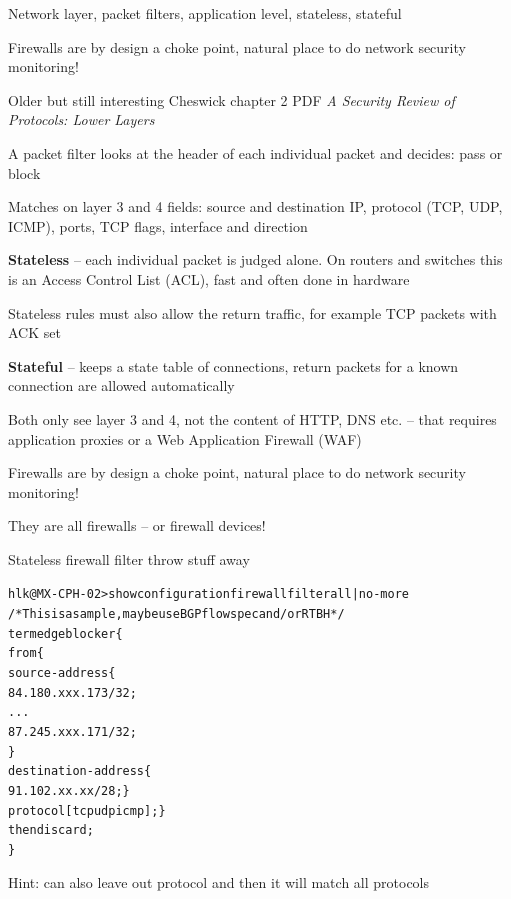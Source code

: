 \documentclass[Screen16to9,17pt]{foils}
\begin{document}
\begin{list2}
\item Network layer, packet filters, application level, stateless, stateful
\item Firewalls are by design a choke point, natural place to do network security monitoring!
\item Older but still interesting Cheswick chapter 2 PDF
\emph{A Security Review of Protocols:
Lower Layers}\\
\end{list2}



A packet filter looks at the header of each individual packet and decides: pass or block
\begin{list2}
\item Matches on layer 3 and 4 fields: source and destination IP, protocol (TCP, UDP, ICMP), ports, TCP flags, interface and direction
\item {\bf Stateless} -- each individual packet is judged alone. On routers and switches this is an Access Control List (ACL), fast and often done in hardware
\item Stateless rules must also allow the return traffic, for example TCP packets with ACK set
\item {\bf Stateful} -- keeps a state table of connections, return packets for a known connection are allowed automatically
\item Both only see layer 3 and 4, not the content of HTTP, DNS etc. -- that requires application proxies or a Web Application Firewall (WAF)
\item Firewalls are by design a choke point, natural place to do network security monitoring!
\end{list2}

They are all firewalls -- or firewall devices!


Stateless firewall filter throw stuff away

\begin{alltt}\footnotesize
hlk@MX-CPH-02> show configuration firewall filter all | no-more
/* This is a sample, maybe use BGP flowspec and/or RTBH */
term edgeblocker \{
    from \{
        source-address \{
            84.180.xxx.173/32;
...
            87.245.xxx.171/32;
        \}
        destination-address \{
            91.102.xx.xx/28; \}
        protocol [ tcp udp icmp ]; \}
    then discard;
\}
\end{alltt}
Hint: can also leave out protocol and then it will match all protocols
\end{document}
